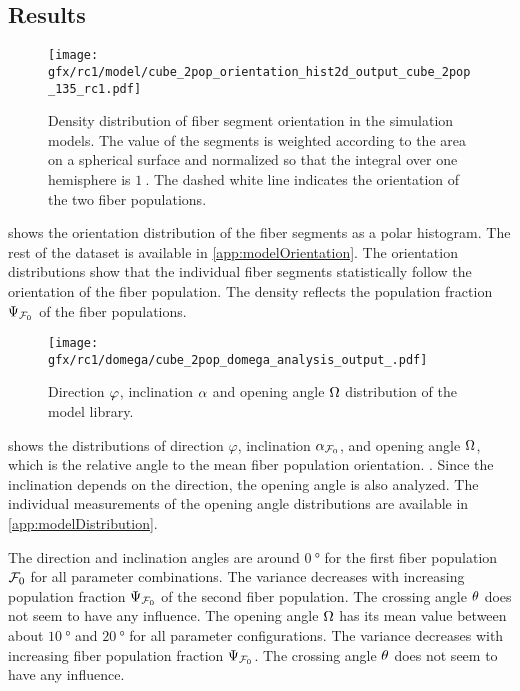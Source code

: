 \subsection{Results}
%
\begin{figure}[!t]
\centering
\texttt{[image: gfx/rc1/model/cube\_2pop\_orientation\_hist2d\_output\_cube\_2pop\_135\_rc1.pdf]}
\caption{Density distribution of fiber segment orientation in the simulation models.
The value of the segments is weighted according to the area on a spherical surface and normalized so that the integral over one hemisphere is $\SI{1}{}$.
The dashed white line indicates the orientation of the two fiber populations.}
\label{fig:modelOrientation}
\end{figure}
%
 shows the orientation distribution of the fiber segments as a polar histogram.
The rest of the dataset is available in \cref{app:modelOrientation}.
The orientation distributions show that the individual fiber segments statistically follow the orientation of the fiber population.
The density reflects the population fraction $\textnormal{$\Psi_{\textnormal{$\mathcal{F}_0$}}$}$ of the fiber populations.
\par
% 
\begin{figure}[!t]
    \centering
    \texttt{[image: gfx/rc1/domega/cube\_2pop\_domega\_analysis\_output\_.pdf]}
    \caption{Direction $\textnormal{$\varphi$}$, inclination $\textnormal{$\alpha$}$ and opening angle $\textnormal{$\Omega$}$ distribution of the model library.}
    \label{fig:modelAngleBoxPlot}
\end{figure}
%
 shows the distributions of direction $\varphi$, inclination $\textnormal{$\alpha_{\textnormal{$\mathcal{F}_0$}}$}$, and opening angle $\textnormal{$\Omega$}$, which is the relative angle to the mean fiber population orientation.
\dummy{}.
Since the inclination depends on the direction, the opening angle is also analyzed.
The individual measurements of the opening angle distributions are available in \cref{app:modelDistribution}.
\par
% 
The direction and inclination angles are around $\SI{0}{\degree}$ for the first fiber population $\textnormal{$\mathcal{F}_0$}$ for all parameter combinations.
The variance decreases with increasing population fraction $\textnormal{$\Psi_{\textnormal{$\mathcal{F}_0$}}$}$ of the second fiber population.
The crossing angle $\textnormal{$\theta$}$ does not seem to have any influence.
The opening angle $\textnormal{$\Omega$}$ has its mean value between about $\SI{10}{\degree}$ and $\SI{20}{\degree}$ for all parameter configurations.
The variance decreases with increasing fiber population fraction $\textnormal{$\Psi_{\textnormal{$\mathcal{F}_0$}}$}$.
The crossing angle $\textnormal{$\theta$}$ does not seem to have any influence.
